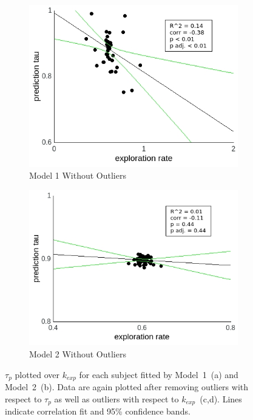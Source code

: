 \documentclass[a4paper]{scrreprt}
\begin{document}
\begin{figure}
\begin{subfigure}[b]{0.49\textwidth}
        \includegraphics[width=\textwidth]{figs/sec3/temp/tempno_predno_mod1.jpeg}
        \caption{Model 1 Without Outliers}
    \end{subfigure}
    \begin{subfigure}[b]{0.49\textwidth}
        \includegraphics[width=\textwidth]{figs/sec3/temp/tempno_predno_mod2.jpeg}
        \caption{Model 2 Without Outliers}
    \end{subfigure}
\caption{$\tau_p$ plotted over $k_{exp}$ for each subject fitted by Model~1~(a) and Model~2~(b). Data are again plotted after removing outliers with respect to $\tau_p$ as well as outliers with respect to $k_{exp}$~(c,d). Lines indicate correlation fit and 95\% confidence bands.}
\label{fig:temp_pred}
\end{figure}
\end{document}
